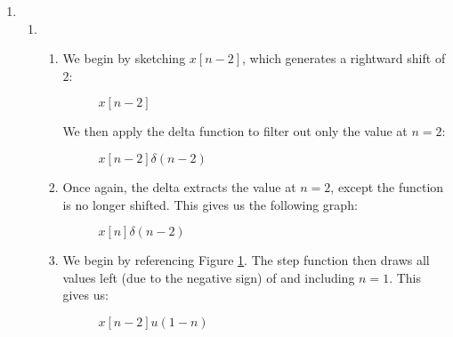 \begin{enumerate}

  \item

    \begin{enumerate}[label=\textbf{\Roman*.}]

      \item 

        \begin{enumerate}[label=\alph*)]

          \item 

            We begin by sketching $x[n-2]$, which generates a rightward shift of $2$:

            \begin{figure}[H]
              \centering
              
              \caption{$x[n-2]$}
              \label{fig:1}
            \end{figure}

            We then apply the delta function to filter out only the value at $n=2$:

            \begin{figure}[H]
              \centering
              
              \caption{$x[n-2]\delta(n-2)$}
              \label{fig:2}
            \end{figure}

          \item 

            Once again, the delta extracts the value at $n=2$, except the function is no longer shifted. This gives us the following graph:

            \begin{figure}[H]
              \centering
              
              \caption{$x[n]\delta(n-2)$}
              \label{fig:3}
            \end{figure}

          \item 

            We begin by referencing Figure \ref{fig:1}. The step function then draws all values left (due to the negative sign) of and including $n=1$. This gives us:

            \begin{figure}[H]
              \centering
              
              \caption{$x[n-2]u(1-n)$}
              \label{fig:4}
            \end{figure}


\end{enumerate}
\end{enumerate}
\end{enumerate}
